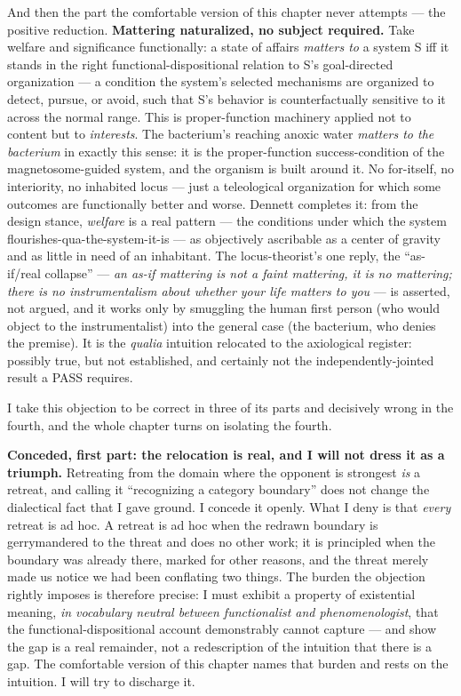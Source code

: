 \documentclass[11pt]{article}
\begin{document}
And then the part the comfortable version of this chapter never attempts — the positive reduction. \textbf{Mattering naturalized, no subject required.} Take welfare and significance functionally: a state of affairs \emph{matters to} a system S iff it stands in the right functional-dispositional relation to S's goal-directed organization — a condition the system's selected mechanisms are organized to detect, pursue, or avoid, such that S's behavior is counterfactually sensitive to it across the normal range. This is proper-function machinery applied not to content but to \emph{interests}. The bacterium's reaching anoxic water \emph{matters to the bacterium} in exactly this sense: it is the proper-function success-condition of the magnetosome-guided system, and the organism is built around it. No for-itself, no interiority, no inhabited locus — just a teleological organization for which some outcomes are functionally better and worse. Dennett completes it: from the design stance, \emph{welfare} is a real pattern — the conditions under which the system flourishes-qua-the-system-it-is — as objectively ascribable as a center of gravity and as little in need of an inhabitant. The locus-theorist's one reply, the ``as-if/\allowbreak{}real collapse'' — \emph{an as-if mattering is not a faint mattering, it is no mattering; there is no instrumentalism about whether your life matters to you} — is asserted, not argued, and it works only by smuggling the human first person (who would object to the instrumentalist) into the general case (the bacterium, who denies the premise). It is the \emph{qualia} intuition relocated to the axiological register: possibly true, but not established, and certainly not the independently-jointed result a PASS requires.

I take this objection to be correct in three of its parts and decisively wrong in the fourth, and the whole chapter turns on isolating the fourth.

\textbf{Conceded, first part: the relocation is real, and I will not dress it as a triumph.} Retreating from the domain where the opponent is strongest \emph{is} a retreat, and calling it ``recognizing a category boundary'' does not change the dialectical fact that I gave ground. I concede it openly. What I deny is that \emph{every} retreat is ad hoc. A retreat is ad hoc when the redrawn boundary is gerrymandered to the threat and does no other work; it is principled when the boundary was already there, marked for other reasons, and the threat merely made us notice we had been conflating two things. The burden the objection rightly imposes is therefore precise: I must exhibit a property of existential meaning, \emph{in vocabulary neutral between functionalist and phenomenologist}, that the functional-dispositional account demonstrably cannot capture — and show the gap is a real remainder, not a redescription of the intuition that there is a gap. The comfortable version of this chapter names that burden and rests on the intuition. I will try to discharge it.
\end{document}
